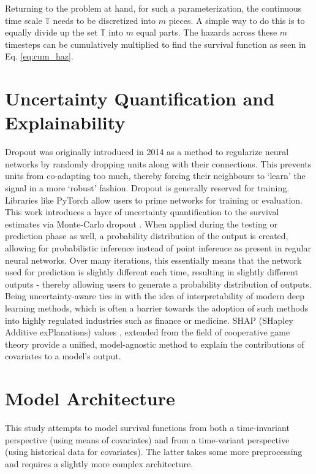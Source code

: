 \documentclass[%
 twocolumn,
 reprint,
 amsmath,amssymb,
 aps,nofootinbib
]{revtex4-2}
\begin{document}
Returning to the problem at hand, for such a parameterization, the continuous time scale $\mathbb{T}$ needs to be discretized into $m$ pieces. A simple way to do this is to equally divide up the set $\mathbb{T}$ into $m$ equal parts. The hazards across these $m$ timesteps can be cumulatively multiplied to find the survival function as seen in Eq. \ref{eq:cum_haz}. 

\section{\label{UQ_explain}Uncertainty Quantification and Explainability}
Dropout was originally introduced in 2014 \cite{dropout} as a method to regularize neural networks by randomly dropping units along with their connections. This prevents units from co-adapting too much, thereby forcing their neighbours to `learn' the signal in a more `robust' fashion. Dropout is generally reserved for training. Libraries like PyTorch allow users to prime networks for training or evaluation.\\

This work introduces a layer of uncertainty quantification to the survival estimates via Monte-Carlo dropout \cite{mcdropout}. When applied during the testing or prediction phase as well, a probability distribution of the output is created, allowing for probabilistic inference instead of point inference as present in regular neural networks. Over many iterations, this essentially means that the network used for prediction is slightly different each time, resulting in slightly different outputs - thereby allowing users to generate a probability distribution of outputs.\\

Being uncertainty-aware ties in with the idea of interpretability of modern deep learning methods, which is often a barrier towards the adoption of such methods into highly regulated industries such as finance or medicine. SHAP (SHapley Additive exPlanations) values \cite{shap}, extended from the field of cooperative game theory provide a unified, model-agnostic method to explain the contributions of covariates to a model's output.

\section{\label{model_arch}Model Architecture}
This study attempts to model survival functions from both a time-invariant perspective (using means of covariates) and from a time-variant perspective (using historical data for covariates). The latter takes some more preprocessing and requires a slightly more complex architecture.
\end{document}
